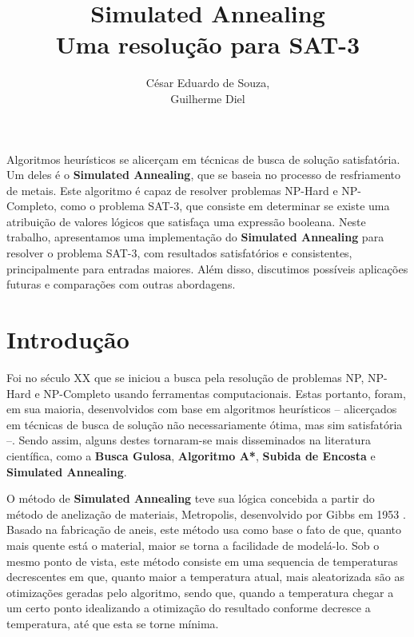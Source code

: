 \documentclass[12pt]{article}
\title{Simulated Annealing\\ Uma resolução para SAT-3}
\author{César Eduardo de Souza\inst{1},\\ Guilherme Diel\inst{1}}
\begin{document}
 

\maketitle

     
\begin{resumo} 
  Algoritmos heurísticos se alicerçam em técnicas de busca de solução satisfatória. Um deles é o \textbf{Simulated Annealing}, que se baseia no processo de resfriamento de metais. Este algoritmo é capaz de resolver problemas NP-Hard e NP-Completo, como o problema SAT-3, que consiste em determinar se existe uma atribuição de valores lógicos que satisfaça uma expressão booleana. Neste trabalho, apresentamos uma implementação do \textbf{Simulated Annealing} para resolver o problema SAT-3, com resultados satisfatórios e consistentes, principalmente para entradas maiores. Além disso, discutimos possíveis aplicações futuras e comparações com outras abordagens.
\end{resumo}


\section{Introdução}
\label{sec:introducao}

Foi no século XX que se iniciou a busca pela resolução de problemas NP, NP-Hard e NP-Completo usando ferramentas computacionais. 
%
Estas portanto, foram, em sua maioria, desenvolvidos com base em algoritmos heurísticos – alicerçados em técnicas de busca de solução não necessariamente ótima, mas sim satisfatória –. 
%
Sendo assim, alguns destes tornaram-se mais disseminados na literatura científica, como a \textbf{Busca Gulosa}, \textbf{Algoritmo A*}, \textbf{Subida de Encosta} e \textbf{Simulated Annealing}. 

O método de \textbf{Simulated Annealing} teve sua lógica concebida a partir do método de anelização de materiais, Metropolis, desenvolvido por Gibbs em 1953 \cite{metropolis1953equation}.
%
Basado na fabricação de aneis, este método usa como base o fato de que, quanto mais quente está o material, maior se torna a facilidade de modelá-lo.
%
Sob o mesmo ponto de vista, este método consiste em uma sequencia de temperaturas decrescentes em que, quanto maior a temperatura atual, mais aleatorizada são as otimizações geradas pelo algoritmo, sendo que, quando a temperatura chegar a um certo ponto idealizando a otimização do resultado conforme decresce a temperatura, até que esta se torne mínima.
\end{document}
